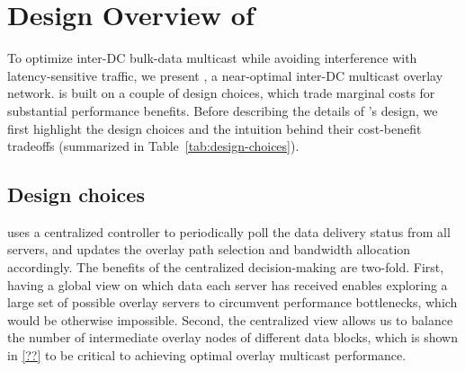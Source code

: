 \section{Design Overview of \name}
\label{sec:overview}

To optimize inter-DC bulk-data multicast while avoiding 
interference with latency-sensitive traffic, we present \name, 
a near-optimal inter-DC multicast overlay network.
\name is built on a couple of design choices, which
trade marginal costs for substantial performance benefits. 
Before describing the details of \name's design, we first
highlight the design choices and the intuition behind 
their cost-benefit tradeoffs 
(summarized in Table~\ref{tab:design-choices}).



\subsection{Design choices}

\name uses a centralized controller to periodically poll 
the data delivery status from all servers, and 
updates the overlay path selection and bandwidth allocation 
accordingly.
The benefits of the centralized decision-making are
two-fold. 
First, having a global view on which data each server has 
received enables exploring a large set of possible 
overlay servers to circumvent performance bottlenecks,
which would be otherwise impossible. 
Second, the centralized view allows us to 
balance the number of intermediate overlay nodes of different
data blocks, which is shown in \Section\ref{??} 
to be critical to 
achieving optimal overlay multicast performance.



